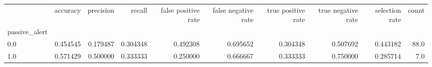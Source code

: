 \begin{tabular}{lrrrrrrrrr}
\toprule
{} &  accuracy &  precision &    recall &  false positive rate &  false negative rate &  true positive rate &  true negative rate &  selection rate &  count \\
passive\_alert &           &            &           &                      &                      &                     &                     &                 &        \\
\midrule
0.0           &  0.454545 &   0.179487 &  0.304348 &             0.492308 &             0.695652 &            0.304348 &            0.507692 &        0.443182 &   88.0 \\
1.0           &  0.571429 &   0.500000 &  0.333333 &             0.250000 &             0.666667 &            0.333333 &            0.750000 &        0.285714 &    7.0 \\
\bottomrule
\end{tabular}
